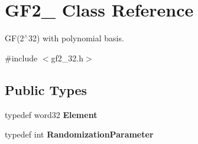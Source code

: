 \hypertarget{class_g_f2__32}{
\section{GF2\_ Class Reference}
\label{class_g_f2__32}
}


GF(2$^\wedge$32) with polynomial basis.  


{\ttfamily \#include $<$gf2\_\-32.h$>$}\subsection*{Public Types}
\begin{DoxyCompactItemize}
\item 
\hypertarget{class_g_f2__32_a72d3258fb8c36f2bb8a544b96d453a03}{
typedef word32 {\bfseries Element}}
\label{class_g_f2__32_a72d3258fb8c36f2bb8a544b96d453a03}

\item 
\hypertarget{class_g_f2__32_a1467bd719b3edf9a5b577fec99687362}{
typedef int {\bfseries RandomizationParameter}}
\label{class_g_f2__32_a1467bd719b3edf9a5b577fec99687362}

\end{DoxyCompactItemize}
